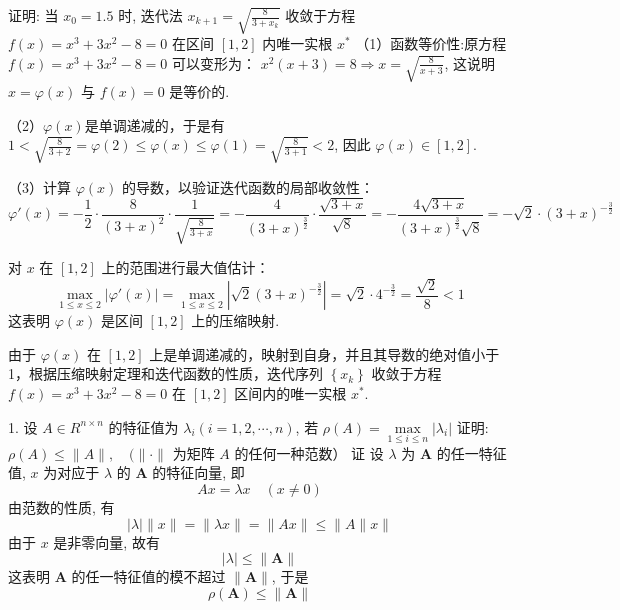 \begin{tcolorbox}[breakable,
		colframe=white!10!jingga, coltitle=white!90!jingga, colback=white!95!jingga, coltext=black, colbacktitle=white!10!jingga, enhanced, fonttitle=\bfseries,fontupper=\normalsize, attach boxed title to top left={yshift=-2mm}, before skip=8pt, after skip=8pt,
		title=解答题]

证明: 当 $ x_{0}=1.5 $ 时, 迭代法 $ {x}_{{k}+1}=\sqrt{\frac{8}{3+{x}_{{k}}}} $ 收敛于方程 $ f(x)=x^{3}+3 x^{2}-8=0 $ 在区间 $ [1,2] $ 内唯一实根 $ x^{*} $
\tcblower
（1）函数等价性:原方程 $ f(x) = x^3 + 3x^2 - 8 = 0 $ 可以变形为：
 $x^2(x + 3) = 8 \Rightarrow x = \sqrt{\frac{8}{x + 3}}$,
这说明 $ x = \varphi(x) $ 与 $ f(x) = 0 $ 是等价的.

 （2）$\varphi(x)$是单调递减的，于是有 $1<\sqrt{\frac{8}{3+2}}=\varphi(2) \leqslant \varphi(x) \leqslant \varphi(1)=\sqrt{\frac{8}{3+1}}<2 $, 因此 $\varphi(x) \in[1,2]$.


 （3）计算 $ \varphi(x) $ 的导数，以验证迭代函数的局部收敛性：
$$ \varphi'(x) = -\frac{1}{2} \cdot \frac{8}{(3+x)^2} \cdot \frac{1}{\sqrt{\frac{8}{3+x}}}= -\frac{4}{(3+x)^{\frac{3}{2}}} \cdot \frac{\sqrt{3+x}}{\sqrt{8}} = -\frac{4 \sqrt{3+x}}{(3+x)^{\frac{3}{2}} \sqrt{8}} = -\sqrt{2} \cdot (3+x)^{-\frac{3}{2}} $$

对 $ x $ 在 $[1, 2]$ 上的范围进行最大值估计：
$$ \max_{1 \leqslant x \leqslant 2} |\varphi'(x)| = \max_{1 \leqslant x \leqslant 2} \left|\sqrt{2}(3+x)^{-\frac{3}{2}}\right| = \sqrt{2} \cdot 4^{-\frac{3}{2}} = \frac{\sqrt{2}}{8}<1 $$
这表明 $ \varphi(x) $ 是区间 $[1, 2]$ 上的压缩映射.

由于 $ \varphi(x) $ 在 $[1, 2]$ 上是单调递减的，映射到自身，并且其导数的绝对值小于 1，根据压缩映射定理和迭代函数的性质，迭代序列 $ \left\{x_k\right\} $ 收敛于方程 $ f(x) = x^3 + 3x^2 - 8 = 0 $ 在 $[1, 2]$ 区间内的唯一实根 $ x^* $.

\end{tcolorbox}

\begin{tcolorbox}[breakable,
		colframe=white!10!jingga, coltitle=white!90!jingga, colback=white!95!jingga, coltext=black, colbacktitle=white!10!jingga, enhanced, fonttitle=\bfseries,fontupper=\normalsize, attach boxed title to top left={yshift=-2mm}, before skip=8pt, after skip=8pt,
		title=解答题]

1. 设 $ A \in R^{n \times n} $ 的特征值为 $ \lambda_{i}(i=1,2, \cdots, n) $, 若 $ \rho(A)=\max\limits _{1\leqslant i\leqslant  n}\left|\lambda_{i}\right| $
证明: $ \rho(A) \leqslant \|A\|, \quad(\|\cdot \| $ 为矩阵 $A$ 的任何一种范数）
   \tcblower
证 \; 设 $ \lambda $ 为 $ \boldsymbol{A} $ 的任一特征值, $ x $ 为对应于 $ \lambda $ 的 $ \boldsymbol{A} $ 的特征向量, 即
$$
A x=\lambda x \quad(x \neq 0)
$$
由范数的性质, 有
$$
|\lambda|\|x\|=\|\lambda x\|=\|A x\| \leqslant\|A\| x \|
$$
由于 $ x $ 是非零向量, 故有
$$
|\lambda| \leqslant\|\boldsymbol{A}\|
$$
这表明 $ \boldsymbol{A} $ 的任一特征值的模不超过 $ \|\boldsymbol{A}\| $, 于是
$$
\rho(\boldsymbol{A}) \leqslant\|\boldsymbol{A}\|
$$
\end{tcolorbox}


